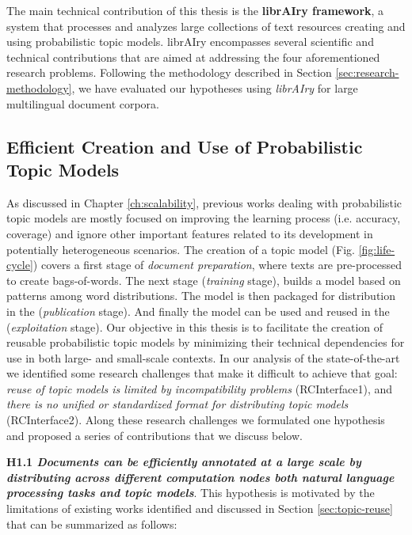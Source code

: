 The main technical contribution of this thesis is the \textbf{librAIry framework}, a system that processes and analyzes large collections of text resources creating and using probabilistic topic models. librAIry encompasses several scientific and technical contributions that are aimed at addressing the four aforementioned research problems. Following the methodology described in Section \ref{sec:research-methodology}, we have evaluated our hypotheses using \textit{librAIry} for large multilingual document corpora. 

\subsection{Efficient Creation and Use of Probabilistic Topic Models}

As discussed in Chapter \ref{ch:scalability}, previous works dealing with probabilistic topic models are mostly focused on improving the learning process (i.e. accuracy, coverage) and ignore other important features related to its development in potentially heterogeneous scenarios. The creation of a topic model (Fig. \ref{fig:life-cycle}) covers a first stage of \textit{document preparation}, where texts are pre-processed to create bags-of-words. The next stage (\textit{training} stage),  builds a model based on patterns among word distributions. The model is then packaged for distribution in the (\textit{publication} stage). And finally the model can be used and reused in the (\textit{exploitation} stage). Our objective in this thesis is to facilitate the creation of reusable probabilistic topic models by minimizing their technical dependencies for use in both large- and small-scale contexts. In our analysis of the state-of-the-art we identified some research challenges that make it difficult to achieve that goal:  \textit{reuse of topic models is limited by incompatibility problems} (RCInterface1), and \textit{there is no unified or standardized format for distributing topic models} (RCInterface2). Along these research challenges we formulated one hypothesis and proposed a series of contributions that we discuss below.

\textbf{H1.1 \textit{Documents can be efficiently annotated at a large scale by distributing across different computation nodes both natural language processing tasks and topic models}}. This hypothesis is motivated by the limitations of existing works identified and discussed in Section \ref{sec:topic-reuse} that can be summarized as follows:

